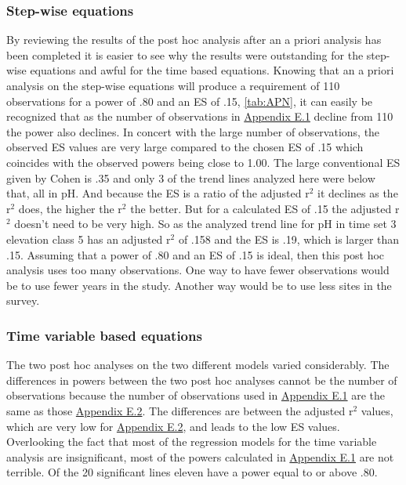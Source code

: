 \subsubsection{Step-wise equations}

By reviewing the results of the post hoc analysis after an a priori analysis has been completed it is easier to see why the results were outstanding for the step-wise equations and awful for the time based equations.
Knowing that an a priori analysis on the step-wise equations will produce a requirement of 110 observations for a power of .80 and an ES of .15, \autoref{tab:APN}, it can easily be recognized that as the number of observations in \hyperref[sec:SWPHPA]{Appendix E.1} decline from 110 the power also declines.
In concert with the large number of observations, the observed ES values are very large compared to the chosen ES of .15 which coincides with the observed powers being close to 1.00.
The large conventional ES given by Cohen is .35 and only 3 of the trend lines analyzed here were below that, all in pH.
And because the ES is a ratio of the adjusted r$^2$ it declines as the r$^2$ does, the higher the r$^2$ the better.
But for a calculated ES of .15 the adjusted r$^2$ doesn't need to be very high.
So as the analyzed trend line for pH in time set 3 elevation class 5 has an adjusted r$^2$ of .158 and the ES is .19, which is larger than .15.
Assuming that a power of .80 and an ES of .15 is ideal, then this post hoc analysis uses too many observations.
One way to have fewer observations would be to use fewer years in the study.
Another way would be to use less sites in the survey.

\subsubsection{Time variable based equations}%
The two post hoc analyses on the two different models varied considerably.
The differences in powers between the two post hoc analyses cannot be the number of observations because the number of observations used in \hyperref[sec:SWPHPA]{Appendix E.1} are the same as those \hyperref[sec:TVPHPA]{Appendix E.2}.
The differences are between the adjusted r$^2$ values, which are very low for \hyperref[sec:TVPHPA]{Appendix E.2}, and leads to the low ES values.
Overlooking the fact that most of the regression models for the time variable analysis are insignificant, most of the powers calculated in \hyperref[sec:SWPHPA]{Appendix E.1} are not terrible.
Of the 20 significant lines eleven have a power equal to or above .80.

